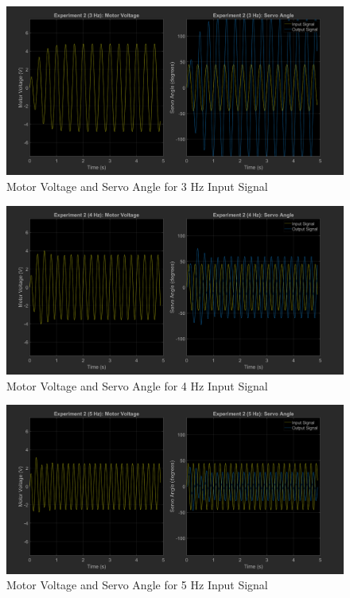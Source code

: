 \documentclass[12pt]{article}
\begin{document}
\begin{figure}[h!]
    \centering
    \includegraphics[width=\textwidth]{exp2_3}
    \caption{\label{fig:exp2_0.5}Motor Voltage and Servo Angle for 3 Hz Input Signal}
\end{figure}
\begin{figure}[h!]
    \centering
    \includegraphics[width=\textwidth]{exp2_4}
    \caption{\label{fig:exp2_0.5}Motor Voltage and Servo Angle for 4 Hz Input Signal}
\end{figure}
\begin{figure}[h!]
    \centering
    \includegraphics[width=\textwidth]{exp2_5}
    \caption{\label{fig:exp2_0.5}Motor Voltage and Servo Angle for 5 Hz Input Signal}
\end{figure}
\end{document}
